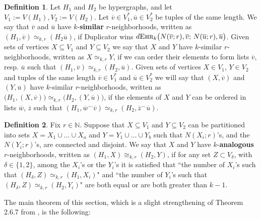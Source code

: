 \documentclass[12pt,notitlepage,a4paper]{article}
\theoremstyle{definition}
\newtheorem{definition}{Definition}[section]
\newcommand{\N}{\mathbb{N}}
\newcommand{\ehr}{\textsc{Ehr}}
\begin{document}
\begin{definition} \label{def:similar}
Let $H_1$ and $H_2$ be hypergraphs, and let
$V_1:=V(H_1), V_2:=V(H_2)$.
Let $\overline{v} \in V_1^*, 
\overline{u} \in V_2^*$ be tuples of the same length.
We say that $\overline{v}$ and $\overline{u}$ have
$k$-\textbf{similar} $r$-neighborhoods, written as
$(H_1,\overline{v})\simeq_{k,r}(H_2 \overline{u})$, if Duplicator wins
$d\ehr_k\big(N(\overline{v};r),
\overline{v};\, N(\overline{u};r),\overline{u}\big)$.
Given sets of vertices $X\subseteq V_1$ and $Y\subseteq V_2$
we say that $X$ and $Y$ have $k$-similar
$r$-neighborhoods, written as
$X\simeq_{k,r} Y$, if we can order their elements to form
lists $\overline{v}$, resp. $\overline{u}$ such that 
$(H_1,\overline{v})\simeq_{k,r}(H_2,\overline{u})$. 
Given sets of vertices $X\in V_1$, $Y\in V_2$ and 
tuples of the same length $\overline{v}\in V_1^*$ and
$\overline{u}\in V_2^*$ we will say that $(X,\overline{v})$ 
and $(Y,\overline{u})$ have $k$-similar $r$-neighborhoods,
written as $\big(H_1, (X,\overline{v})  \big)
\simeq_{k,r} \big(H_2, (Y,\overline{u})  \big)$, if
the elements of $X$ and $Y$ can be ordered in lists
$\overline{w}$, $\overline{z}$ such that
$(H_1,\overline{w}^\smallfrown \overline{v})
\simeq_{k,r} (H_2,\overline{z}^\smallfrown \overline{u})$. 
\end{definition}

\begin{definition} \label{def:analogous}
Fix $r\in \N$. Suppose that $X\subseteq V_1$ and 
$Y\subseteq V_2$ can
be partitioned into sets $X=X_1\cup \dots \cup X_a$
and $Y=Y_1\cup \dots \cup Y_b$ 
such that $N(X_i;r)$'s, and the
$N(Y_i;r)$'s, are connected and disjoint. 
We say that $X$ and
$Y$ have $k$-\textbf{analogous} $r$-neighborhoods,
written as $(H_1,X)\cong_{k,r} (H_2,Y)$, 
if for any set $Z\subset V_\delta$, with $\delta\in \{1,2\}$,
among the $X_i$'s or the $Y_i$'s
it is satisfied that ``the number of $X_i$'s  
such that $(H_\delta, Z) \simeq_{k,r} (H_1,X_i)$" 
and ``the number of $Y_i$'s such that
$(H_\delta,Z)\simeq_{k,r} (H_2,Y_i)$"
are both equal or are both greater than $k-1$.
\end{definition}

The main theorem of this section, which
is a slight strengthening of Theorem 
2.6.7 from \cite{spencer2013strange}, is the following:
\end{document}
